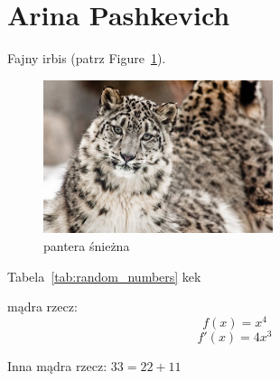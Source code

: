 \section{Arina Pashkevich}
\label{sec:pashkevich}

Fajny irbis (patrz Figure~\ref{fig:irbis}).

\begin{figure}[htbp]
    \centering
    \includegraphics[width=0.6\textwidth]{pictures/irbis.jpg}
    \caption{pantera śnieżna}
    \label{fig:irbis}
\end{figure}

Tabela~\ref{tab:random_numbers} kek



mądra rzecz: \[f(x) = x^4\]
\[f'(x) = 4x^3\]


Inna mądra rzecz:
$ 33=22+11 $